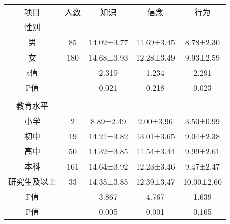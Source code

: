 \documentclass{article}
\begin{document}
\begin{table}[]
    \centering
    \begin{tabular}{ccccc}
        \cellcolor[HTML]{FFFFFF}项目 & \cellcolor[HTML]{FFFFFF}人数  & \cellcolor[HTML]{FFFFFF}知识         & 信念         & 行为         \\
        \cellcolor[HTML]{FFFFFF}性别 & \cellcolor[HTML]{FFFFFF}    & \cellcolor[HTML]{FFFFFF}           &            &            \\
        \cellcolor[HTML]{FFFFFF}男  & \cellcolor[HTML]{FFFFFF}85  & \cellcolor[HTML]{FFFFFF}14.02±3.77 & 11.69±3.45 & 8.78±2.30  \\
        \cellcolor[HTML]{FFFFFF}女  & \cellcolor[HTML]{FFFFFF}180 & \cellcolor[HTML]{FFFFFF}14.68±3.93 & 12.28±3.49 & 9.93±2.59  \\
        \cellcolor[HTML]{FFFFFF}t值 & \cellcolor[HTML]{FFFFFF}    & \cellcolor[HTML]{FFFFFF}2.319      & 1.234      & 2.291      \\
        P值                         &                             & 0.021                              & 0.218      & 0.023      \\
        &                             &                                    &            &            \\
        教育水平                       &                             &                                    &            &            \\
        小学                         & 2                           & 8.89±2.49                          & 2.00±3.96  & 3.50±0.99  \\
        初中                         & 19                          & 14.21±3.82                         & 13.01±3.65 & 9.04±2.38  \\
        高中                         & 50                          & 14.32±3.85                         & 11.54±3.44 & 9.99±2.61  \\
        本科                         & 161                         & 14.64±3.92                         & 12.23±3.46 & 9.47±2.47  \\
        研究生及以上                     & 33                          & 14.35±3.85                         & 12.39±3.47 & 10.00±2.60 \\
        F值                         &                             & 3.867                              & 4.767      & 1.639      \\
        P值                         &                             & 0.005                              & 0.001      & 0.165      \\

\end{tabular}
\end{table}
\end{document}
